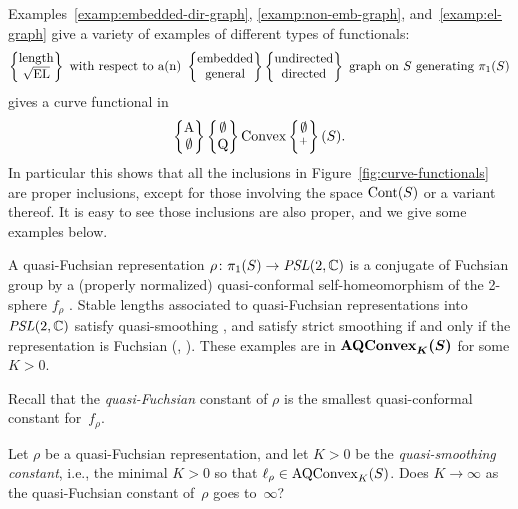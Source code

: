 Examples~\ref{examp:embedded-dir-graph}, \ref{examp:non-emb-graph},
and~\ref{examp:el-graph} give a variety of examples of different types
of functionals:
\[
  \left\{ \begin{matrix} \mathrm{length} \\ \sqrt{\operatorname{EL}} \end{matrix} \right\}
  \text{ with respect to a(n) }
  \left\{ \begin{matrix} \mathrm{embedded} \\ \mathrm{general} \end{matrix} \right\}
  \left\{ \begin{matrix} \mathrm{undirected} \\ \mathrm{directed} \end{matrix} \right\}
  \text{ graph on $S$ generating $\pi_1(S)$}
\]
gives a curve functional in
\[
  \left\{ \begin{matrix} \mathrm{A} \\ \emptyset \end{matrix} \right\}
  \left\{ \begin{matrix} \emptyset \\ \mathrm{Q} \end{matrix} \right\}
  \mathrm{Convex}
  \left\{ \begin{matrix} \emptyset \\ {}^+ \end{matrix} \right\}
  (S).
\]
In particular this shows that all the inclusions in
Figure~\ref{fig:curve-functionals} are proper inclusions, except for
those involving the space $\mathrm{Cont}(S)$ or a variant thereof.
It is easy to see those inclusions are also proper, and we give some
examples below.

\begin{example}
  \label{examp:qf}
A quasi-Fuchsian representation $\rho \colon \pi_1(S) \to
\operatorname{\mathit{PSL}}(2,\mathbb{C})$ is a
conjugate of Fuchsian group by a (properly normalized) quasi-conformal
self\hyp homeomorphism of the 2-sphere $f_{\rho}$
\cite[Definition~6.12.2]{Hub06:Vol1}.
Stable lengths associated to
quasi-Fuchsian representations into $\operatorname{\mathit{PSL}}(2,\mathbb{C})$ satisfy quasi-smoothing
\cite[Proposition~4.11]{MGT21:Smoothings}, and satisfy strict
smoothing if and only if the representation is Fuchsian
(\cite[Theorem~A]{FF22:QF}, \cite[Proposition~1.8]{BR24:Cubulations}).
These examples are in $\bm{\mathrm{AQConvex}_K(S)}$ for some $K > 0$.
\end{example}

Recall that the
\emph{quasi-Fuchsian} constant of $\rho$ is the smallest quasi-conformal
constant for~$f_{\rho}$.
\begin{question}\label{quest:qf-const}
  Let $\rho$ be a
quasi-Fuchsian representation, and let $K>0$ be the \emph{quasi-smoothing
constant}, i.e., the minimal $K>0$ so that $\ell_{\rho} \in \mathrm{AQConvex}_K(S)$. 
Does $K \to \infty$ as the quasi-Fuchsian constant of~$\rho$ goes to~$\infty$?
\end{question} 



